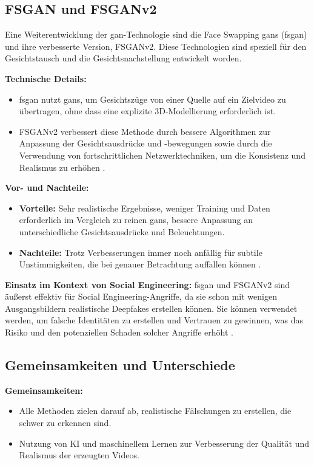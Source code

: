 \subsection{FSGAN und FSGANv2}\label{subsec:fsgan}

Eine Weiterentwicklung der \gls{gan}-Technologie sind die Face Swapping \glspl{gan} (\gls{fsgan}) und ihre verbesserte Version, FSGANv2.
Diese Technologien sind speziell für den Gesichtstausch und die Gesichtsnachstellung entwickelt worden.

\textbf{Technische Details:}
\begin{itemize}
    \item \gls{fsgan} nutzt \glspl{gan}, um Gesichtszüge von einer Quelle auf ein Zielvideo zu übertragen, ohne dass eine explizite 3D-Modellierung erforderlich ist.
    \item FSGANv2 verbessert diese Methode durch bessere Algorithmen zur Anpassung der Gesichtsausdrücke und -bewegungen sowie durch die Verwendung von fortschrittlichen Netzwerktechniken, um die Konsistenz und Realismus zu erhöhen \cite{fsganv2}.
\end{itemize}

\textbf{Vor- und Nachteile:}
\begin{itemize}
    \item \textbf{Vorteile:} Sehr realistische Ergebnisse, weniger Training und Daten erforderlich im Vergleich zu reinen \glspl{gan}, bessere Anpassung an unterschiedliche Gesichtsausdrücke und Beleuchtungen.
    \item \textbf{Nachteile:} Trotz Verbesserungen immer noch anfällig für subtile Unstimmigkeiten, die bei genauer Betrachtung auffallen können \cite{face-swapping-and-reenactment}.
\end{itemize}

\textbf{Einsatz im Kontext von Social Engineering:} \gls{fsgan} und FSGANv2 sind äußerst effektiv für Social Engineering-Angriffe, da sie schon mit wenigen Ausgangsbildern realistische Deepfakes erstellen können.
Sie können verwendet werden, um falsche Identitäten zu erstellen und Vertrauen zu gewinnen, was das Risiko und den potenziellen Schaden solcher Angriffe erhöht \cite{deepfacelab}.

\subsection{Gemeinsamkeiten und Unterschiede}\label{subsec:gemeinsamkeiten-unterschiede}

\textbf{Gemeinsamkeiten:}
\begin{itemize}
    \item Alle Methoden zielen darauf ab, realistische Fälschungen zu erstellen, die schwer zu erkennen sind.
    \item Nutzung von KI und maschinellem Lernen zur Verbesserung der Qualität und Realismus der erzeugten Videos.
\end{itemize}

